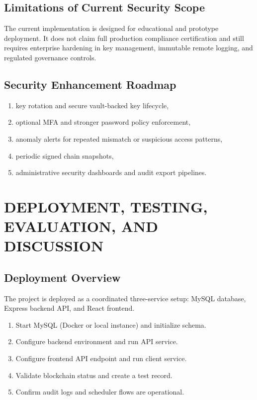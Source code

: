 \documentclass[12pt,a4paper]{report}
\begin{document}
\section{Limitations of Current Security Scope}

The current implementation is designed for educational and prototype deployment. It does not claim full production compliance certification and still requires enterprise hardening in key management, immutable remote logging, and regulated governance controls.

\section{Security Enhancement Roadmap}

\begin{enumerate}
\item key rotation and secure vault-backed key lifecycle,
\item optional MFA and stronger password policy enforcement,
\item anomaly alerts for repeated mismatch or suspicious access patterns,
\item periodic signed chain snapshots,
\item administrative security dashboards and audit export pipelines.
\end{enumerate}

\chapter{DEPLOYMENT, TESTING, EVALUATION, AND DISCUSSION}

\section{Deployment Overview}

The project is deployed as a coordinated three-service setup: MySQL database, Express backend API, and React frontend.

\begin{enumerate}
\item Start MySQL (Docker or local instance) and initialize schema.
\item Configure backend environment and run API service.
\item Configure frontend API endpoint and run client service.
\item Validate blockchain status and create a test record.
\item Confirm audit logs and scheduler flows are operational.
\end{enumerate}
\end{document}
